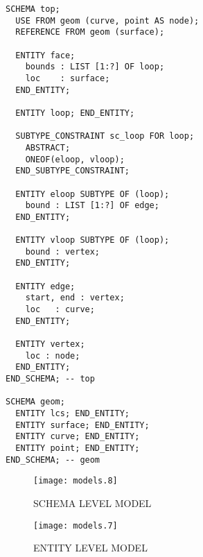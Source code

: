 \begin{remarks}
\remintro
{}

\normalsize
\begin{verbatim}
SCHEMA top;
  USE FROM geom (curve, point AS node);
  REFERENCE FROM geom (surface);

  ENTITY face;
    bounds : LIST [1:?] OF loop;
    loc    : surface;
  END_ENTITY;

  ENTITY loop; END_ENTITY;

  SUBTYPE_CONSTRAINT sc_loop FOR loop;
    ABSTRACT;
    ONEOF(eloop, vloop);
  END_SUBTYPE_CONSTRAINT;

  ENTITY eloop SUBTYPE OF (loop);
    bound : LIST [1:?] OF edge;
  END_ENTITY;

  ENTITY vloop SUBTYPE OF (loop);
    bound : vertex;
  END_ENTITY;

  ENTITY edge;
    start, end : vertex;
    loc   : curve;
  END_ENTITY;

  ENTITY vertex;
    loc : node;
  END_ENTITY;
END_SCHEMA; -- top

SCHEMA geom;
  ENTITY lcs; END_ENTITY;
  ENTITY surface; END_ENTITY;
  ENTITY curve; END_ENTITY;
  ENTITY point; END_ENTITY;
END_SCHEMA; -- geom
\end{verbatim}

\remend
\end{remarks}



\begin{figure}[hp]
\centering
\texttt{[image: models.8]}

\vspace{\afttit}

SCHEMA LEVEL MODEL

\vspace{\afttit}

\texttt{[image: models.7]}

\vspace{\afttit}

ENTITY LEVEL MODEL

\end{figure}

